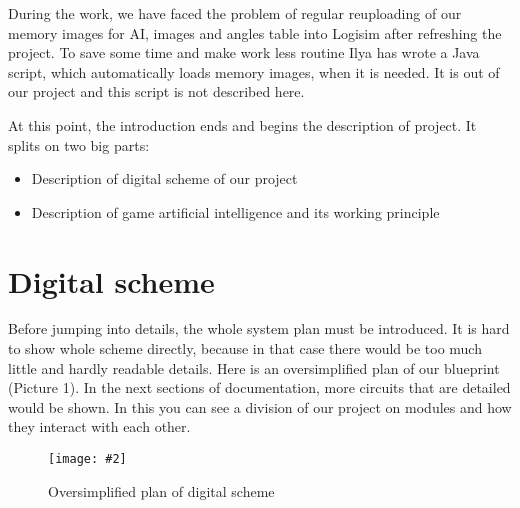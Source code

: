 \documentclass[12pt,a4paper]{article}
\let\oldsection\section
\renewcommand\section{\clearpage\oldsection}
\newcommand{\dofigure}[3][H]{
    \begin{figure}[#1]
        \centering
        \texttt{[image: \#2]}
        \caption{#3}
    \end{figure}
}
\begin{document}
    During the work, we have faced the problem of regular reuploading of our memory images for AI, images and angles table into Logisim after refreshing the project. To save some time and make work less routine Ilya has wrote a Java script, which automatically loads memory images, when it is needed. It is out of our project and this script is not described here.

    At this point, the introduction ends and begins the description of project. It splits on two big parts:
    \begin{itemize}
        \item Description of digital scheme of our project
        \item Description of game artificial intelligence and its working principle
    \end{itemize}


    \section{Digital scheme}
    Before jumping into details, the whole system plan must be introduced. It is hard to show whole scheme directly, because in that case there would be too much little and hardly readable details. Here is an oversimplified plan of our blueprint (Picture 1). In the next sections of documentation, more circuits that are detailed would be shown. In this you can see a division of our project on modules and how they interact with each other.
    \dofigure{scheme.png}{Oversimplified plan of digital scheme}
\end{document}
